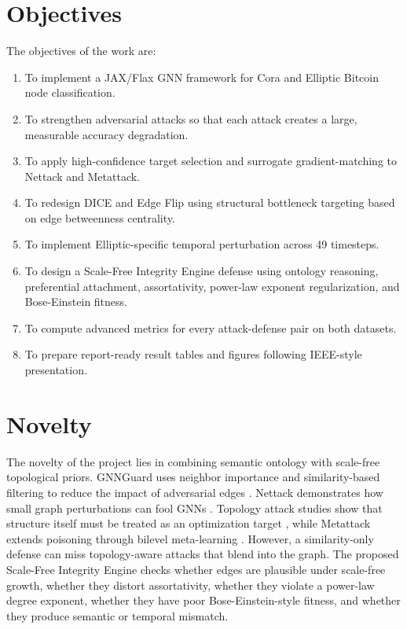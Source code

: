 \documentclass[12pt,oneside]{report}
\begin{document}
\section{Objectives}
The objectives of the work are:
\begin{enumerate}
    \item To implement a JAX/Flax GNN framework for Cora and Elliptic Bitcoin node classification.
    \item To strengthen adversarial attacks so that each attack creates a large, measurable accuracy degradation.
    \item To apply high-confidence target selection and surrogate gradient-matching to Nettack and Metattack.
    \item To redesign DICE and Edge Flip using structural bottleneck targeting based on edge betweenness centrality.
    \item To implement Elliptic-specific temporal perturbation across 49 timesteps.
    \item To design a Scale-Free Integrity Engine defense using ontology reasoning, preferential attachment, assortativity, power-law exponent regularization, and Bose-Einstein fitness.
    \item To compute advanced metrics for every attack-defense pair on both datasets.
    \item To prepare report-ready result tables and figures following IEEE-style presentation.
\end{enumerate}

\section{Novelty}
The novelty of the project lies in combining semantic ontology with scale-free topological priors. GNNGuard uses neighbor importance and similarity-based filtering to reduce the impact of adversarial edges \cite{zhang2020gnnguard}. Nettack demonstrates how small graph perturbations can fool GNNs \cite{zugner2018nettack}. Topology attack studies show that structure itself must be treated as an optimization target \cite{xu2019topology}, while Metattack extends poisoning through bilevel meta-learning \cite{zugner2019metattack}. However, a similarity-only defense can miss topology-aware attacks that blend into the graph. The proposed Scale-Free Integrity Engine checks whether edges are plausible under scale-free growth, whether they distort assortativity, whether they violate a power-law degree exponent, whether they have poor Bose-Einstein-style fitness, and whether they produce semantic or temporal mismatch.
\end{document}
